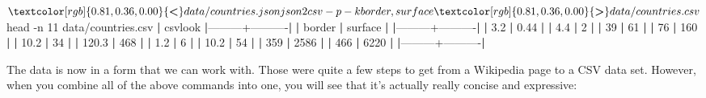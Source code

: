 \documentclass[
]{book}
\newenvironment{Shaded}{\begin{snugshade}}{\end{snugshade}}
\newcommand{\ExtensionTok}[1]{#1}
\newcommand{\FunctionTok}[1]{\textcolor[rgb]{0.00,0.00,0.00}{#1}}
\newcommand{\KeywordTok}[1]{\textcolor[rgb]{0.13,0.29,0.53}{\textbf{#1}}}
\newcommand{\NormalTok}[1]{#1}
\newcommand{\OperatorTok}[1]{\textcolor[rgb]{0.81,0.36,0.00}{\textbf{#1}}}
\theoremstyle{definition}
\theoremstyle{definition}
\theoremstyle{definition}
\theoremstyle{remark}
\begin{document}
\begin{Shaded}
\begin{Highlighting}[]
\NormalTok{$ }\OperatorTok{<} \ExtensionTok{data/countries.json}\NormalTok{ json2csv -p -k border,surface }\OperatorTok{>}\NormalTok{ data/countries.csv}
\NormalTok{$ }\FunctionTok{head}\NormalTok{ -n 11 data/countries.csv }\KeywordTok{|} \ExtensionTok{csvlook}
\KeywordTok{|}\ExtensionTok{---------+----------}\KeywordTok{|}
\KeywordTok{|}  \ExtensionTok{border} \KeywordTok{|} \ExtensionTok{surface}  \KeywordTok{|}
\KeywordTok{|}\ExtensionTok{---------+----------}\KeywordTok{|}
\KeywordTok{|}  \ExtensionTok{3.2}    \KeywordTok{|} \ExtensionTok{0.44}     \KeywordTok{|}
\KeywordTok{|}  \ExtensionTok{4.4}    \KeywordTok{|} \ExtensionTok{2}        \KeywordTok{|}
\KeywordTok{|}  \ExtensionTok{39}     \KeywordTok{|} \ExtensionTok{61}       \KeywordTok{|}
\KeywordTok{|}  \ExtensionTok{76}     \KeywordTok{|} \ExtensionTok{160}      \KeywordTok{|}
\KeywordTok{|}  \ExtensionTok{10.2}   \KeywordTok{|} \ExtensionTok{34}       \KeywordTok{|}
\KeywordTok{|}  \ExtensionTok{120.3}  \KeywordTok{|} \ExtensionTok{468}      \KeywordTok{|}
\KeywordTok{|}  \ExtensionTok{1.2}    \KeywordTok{|} \ExtensionTok{6}        \KeywordTok{|}
\KeywordTok{|}  \ExtensionTok{10.2}   \KeywordTok{|} \ExtensionTok{54}       \KeywordTok{|}
\KeywordTok{|}  \ExtensionTok{359}    \KeywordTok{|} \ExtensionTok{2586}     \KeywordTok{|}
\KeywordTok{|}  \ExtensionTok{466}    \KeywordTok{|} \ExtensionTok{6220}     \KeywordTok{|}
\KeywordTok{|}\ExtensionTok{---------+----------}\KeywordTok{|}
\end{Highlighting}
\end{Shaded}

The data is now in a form that we can work with. Those were quite a few steps to get from a Wikipedia page to a CSV data set. However, when you combine all of the above commands into one, you will see that it's actually really concise and expressive:
\end{document}
